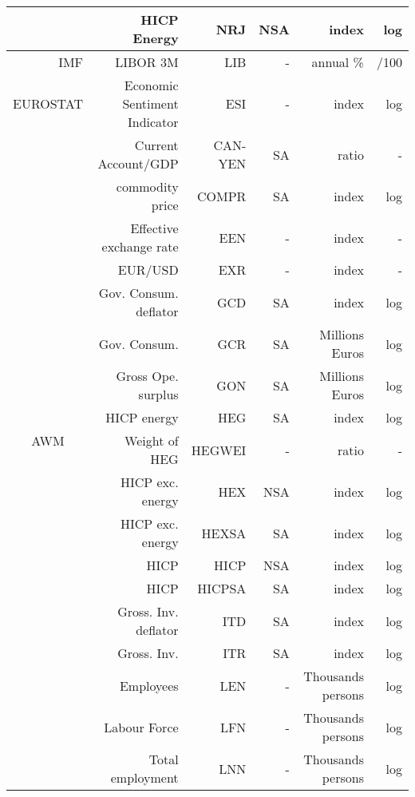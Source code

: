 \documentclass[11pt,a4paper]{article}
\begin{document}
\begin{table}[htbp]
{\begin{tabular}{rrrrrr}
       \multicolumn{1}{c}{} &
      HICP Energy &
      NRJ &
      NSA &
      index &
      log
      \\
      \midrule
      IMF &
      LIBOR 3M &
      LIB &
      - &
      annual \% &
      /100
      \\
      \midrule
    EUROSTAT &
      Economic Sentiment Indicator &
      ESI &
      - &
      index &
      log
      \\
      \midrule
    \multicolumn{1}{c}{\multirow{17}[34]{*}{AWM}} &
      Current Account/GDP &
      CAN-YEN &
      SA &
      ratio &
      -
      \\
      \multicolumn{1}{c}{} &
      commodity price &
      COMPR &
      SA &
      index &
      log
      \\
      \multicolumn{1}{c}{} &
      Effective exchange rate &
      EEN &
      - &
      index &
      -
      \\
      \multicolumn{1}{c}{} &
      EUR/USD &
      EXR &
      - &
      index &
      -
      \\
       \multicolumn{1}{c}{} &
      Gov. Consum. deflator &
      GCD &
      SA &
      index &
      log
      \\
       \multicolumn{1}{c}{} &
      Gov. Consum. &
      GCR &
      SA &
      Millions Euros &
      log
      \\
       \multicolumn{1}{c}{} &
      Gross Ope. surplus &
      GON &
      SA &
      Millions Euros &
      log
      \\
       \multicolumn{1}{c}{} &
      HICP energy &
      HEG &
      SA &
      index &
      log
      \\
       \multicolumn{1}{c}{} &
      Weight of HEG &
      HEGWEI &
      - &
      ratio &
      -
      \\
       \multicolumn{1}{c}{} &
      HICP exc. energy &
      HEX &
      NSA &
      index &
      log
      \\
      \multicolumn{1}{c}{} &
      HICP exc. energy &
      HEXSA &
      SA &
      index &
      log
      \\
      \multicolumn{1}{c}{} &
      HICP  &
      HICP &
      NSA &
      index &
      log
      \\
      \multicolumn{1}{c}{} &
      HICP  &
      HICPSA &
      SA &
      index &
      log
      \\
      \multicolumn{1}{c}{} &
      Gross. Inv. deflator  &
      ITD &
      SA &
      index &
      log
      \\
      \multicolumn{1}{c}{} &
      Gross. Inv.   &
      ITR &
      SA &
      index &
      log
      \\
      \multicolumn{1}{c}{} &
      Employees   &
      LEN &
      - &
      Thousands persons &
      log
      \\
      \multicolumn{1}{c}{} &
      Labour Force   &
      LFN &
      - &
      Thousands persons &
      log
      \\
      \multicolumn{1}{c}{} &
      Total employment   &
      LNN &
      - &
      Thousands persons &
      log
      \\
      

\end{tabular}}
\end{table}
\end{document}
